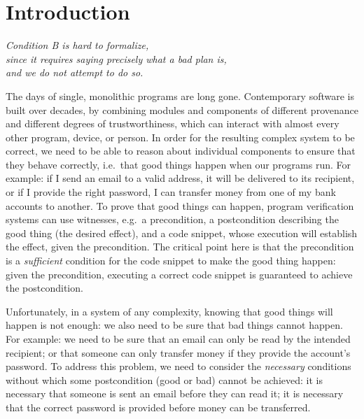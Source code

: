 \renewcommand{\sophia}[2][]{\ponders{Sophia}{blue}{#1} \textcolor{blue}{#2}\xspace}


\section{Introduction}


\begin{flushright}
  \textit{Condition B is hard to formalize, \\since it requires saying precisely what a bad
plan is,\\ and we do not attempt to do so.}\\
 \cite{byzantine}
\end{flushright}

The days of single, monolithic programs are long gone.  Contemporary
software is built over decades, by combining modules and components of
different provenance and different degrees of trustworthiness, which can
interact with almost every other program, device, or person.
In order for the resulting complex system to be correct, we need to be
able to reason about individual components to ensure that they behave
correctly, i.e.\ that good things happen when our programs run.
For example: if I send an email to a valid address, it will be
delivered to its recipient, or if I provide the right password, I can
transfer money from one of my bank accounts to another. 
To prove that good things can
happen, program verification systems can use witnesses, e.g.\ a
precondition, a postcondition describing the good thing (the desired
effect), and a code snippet, whose execution will establish the
effect, given the precondition.  The critical point here is that the
precondition is a \emph{sufficient} condition for the code snippet to
make the good thing happen: given the precondition, executing a
correct code snippet is guaranteed to achieve the postcondition.

Unfortunately, in a system of any complexity, knowing that good things
will happen is not enough: we also need to be sure that bad things
cannot happen. For example: we  need to be sure that an email can
only be read by the intended recipient; or that someone can only transfer
money if they provide the account's password. To address this problem,
we need to consider the \emph{necessary} conditions without which some
postcondition (good or bad) cannot be achieved:
it is necessary that someone is sent an email before they can read it;
it is necessary that the correct password is provided before money can
be transferred.


